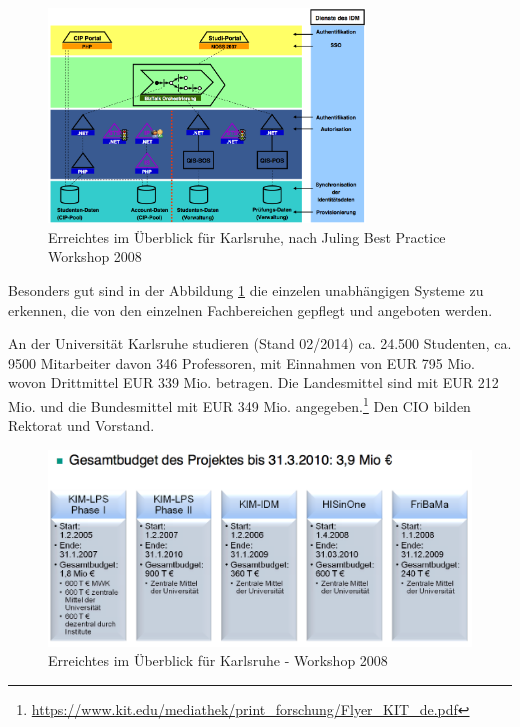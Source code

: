
\begin{figure}[h!]
	\centering
	\includegraphics[width=0.75\textwidth]
	{kapitel/gruppe4_2/bilder/ubersicht_karlsruhe}
	\caption{Erreichtes im Überblick für Karlsruhe, nach Juling Best Practice Workshop 2008}
	\label{fig_ubersicht_karlsruhe}
\end{figure}

Besonders gut sind in der Abbildung \ref{fig_ubersicht_karlsruhe} die einzelen unabhängigen Systeme zu erkennen, die von den einzelnen Fachbereichen gepflegt und angeboten werden. 


An der Universität Karlsruhe studieren (Stand 02/2014) ca. 24.500 Studenten, ca. 9500 Mitarbeiter davon 346 Professoren, mit Einnahmen von EUR 795 Mio. wovon Drittmittel EUR 339 Mio. betragen. Die Landesmittel sind mit EUR 212 Mio. und die Bundesmittel mit EUR 349 Mio. angegeben.\footnote{\url{https://www.kit.edu/mediathek/print_forschung/Flyer_KIT_de.pdf}} Den CIO bilden Rektorat und Vorstand.

\begin{figure}[h!]
	\centering
	\includegraphics[width=\textwidth]
	{kapitel/gruppe4_2/bilder/uberblick_projekt_KIM}
	\caption{Erreichtes im Überblick für Karlsruhe - Workshop 2008}
	\label{fig_uberblick_projekt_KIM}
\end{figure}

